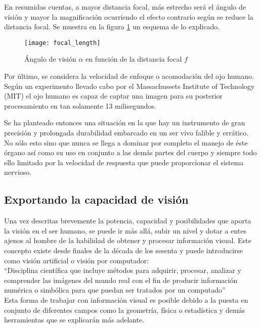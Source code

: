 En resumidas cuentas, a mayor distancia focal, más estrecho será el ángulo de visión y mayor la magnificación ocurriendo el efecto contrario según se reduce la distancia focal. Se muestra en la figura \ref{fig:focal_length} un esquema de lo explicado. 


\begin{figure}[!htb]
\centering
{}
  \texttt{[image: focal\_length]}
  \caption{Ángulo de visión $\alpha$ en función de la distancia focal $f$}\label{fig:focal_length}
\endminipage\hfill

\end{figure}



Por último, se considera la velocidad de enfoque o acomodación del ojo humano. Según un experimento llevado cabo por el Massachussets Institute of Technology (MIT)\cite{mit_experiment} el ojo humano es capaz de captar una imagen para su posterior procesamiento en tan solamente 13 milisegundos.



Se ha planteado entonces una situación en la que hay un instrumento de gran precisión y prolongada durabilidad embarcado en un ser vivo falible y errático. No sólo esto sino que nunca se llega a dominar por completo el manejo de éste órgano así como su uso en conjunto a las demás partes del cuerpo y siempre todo ello limitado por la velocidad de respuesta que puede proporcionar el sistema nervioso.

\subsection{Exportando la capacidad de visión}

Una vez descritas brevemente la potencia, capacidad y posibilidades que aporta la visión en el ser humano, se puede ir más allá, subir un nivel y dotar a entes ajenos al hombre de la habilidad de obtener y procesar información visual. Este concepto existe desde finales de la década de los sesenta y puede introducirse como visión artificial o visión por computador\cite{vision_artificial}:
\\
``Disciplina científica que incluye métodos para adquirir, procesar, analizar y comprender las imágenes del mundo real con el fin de producir información numérica o simbólica para que puedan ser tratados por un computado''
\\
Esta forma de trabajar con información visual es posible debido a la puesta en conjunto de diferentes campos como la geometría, física o estadística y demás herramientas que se explicarán más adelante.

